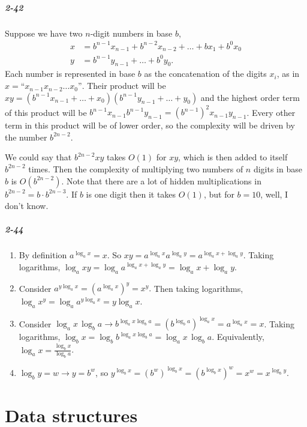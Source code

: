 \documentclass{report}
\begin{document}
\paragraph{2-42} Suppose we have two $n$-digit numbers in base $b$,
\begin{align*}
	x &= b^{n-1} x_{n-1} + b^{n-2} x_{n-2} + \ldots + b x_1 + b^0 x_0 \\
	y &= b^{n-1} y_{n-1} + \ldots + b^0 y_0.
\end{align*}
Each number is represented in base $b$ as the concatenation of the digits $x_i$, as in $x = \text{``}x_{n-1}x_{n-2}\ldots x_0\text{''}$. Their product will be $xy = (b^{n-1}x_{n-1} + \ldots + x_0)(b^{n-1} y_{n-1} + \ldots + y_0)$ and the highest order term of this product will be $b^{n-1} x_{n-1} b^{n-1} y_{n-1} = (b^{n-1})^2 x_{n-1}y_{n-1}$. Every other term in this product will be of lower order, so the complexity will be driven by the number $b^{2n-2}$.

We could say that $b^{2n-2} xy$ takes $O(1)$ for $xy$, which is then added to itself $b^{2n-2}$ times. Then the complexity of multiplying two numbers of $n$ digits in base $b$ is $O(b^{2n-2})$. Note that there are a lot of hidden multiplications in $b^{2n-2} = b\cdot b^{2n-3}$. If $b$ is one digit then it takes $O(1)$, but for $b=10$, well, I don't know.

\paragraph{2-44}
\begin{enumerate}[label=(\alph*)]
	\item By definition $a^{\log_a x} = x$. So $xy = a^{\log_a x} a^{\log_a y} = a^{\log_a x + \log_a y}$. Taking logarithms, $\log_a xy = \log_a a^{\log_a x + \log_a y} = \log_a x + \log_a y.$
	\item Consider $a^{y\log_a x} = (a^{\log_a x})^y = x^y.$ Then taking logarithms, $\log_a x^y = \log_a a^{y\log_a x} = y\log_a x$.
	\item Consider $\log_a x\, \log_b a \to b^{\log_a x \log_b a} = (b^{\log_b a})^{\log_a x} = a^{\log_a x} = x$. Taking logarithms, $\log_b x = \log_b b^{\log_a x \log_b a} = \log_a x\,\log_b a$. Equivalently, $\log_a x = \frac{\log_b x}{\log_b a}$.
	\item $\log_b y = w \to y = b^w$, so $y^{\log_b x} = (b^w)^{\log_b x} = (b^{\log_b x})^w = x^w = x^{\log_b y}$.
\end{enumerate}


\chapter{Data structures}
\end{document}
